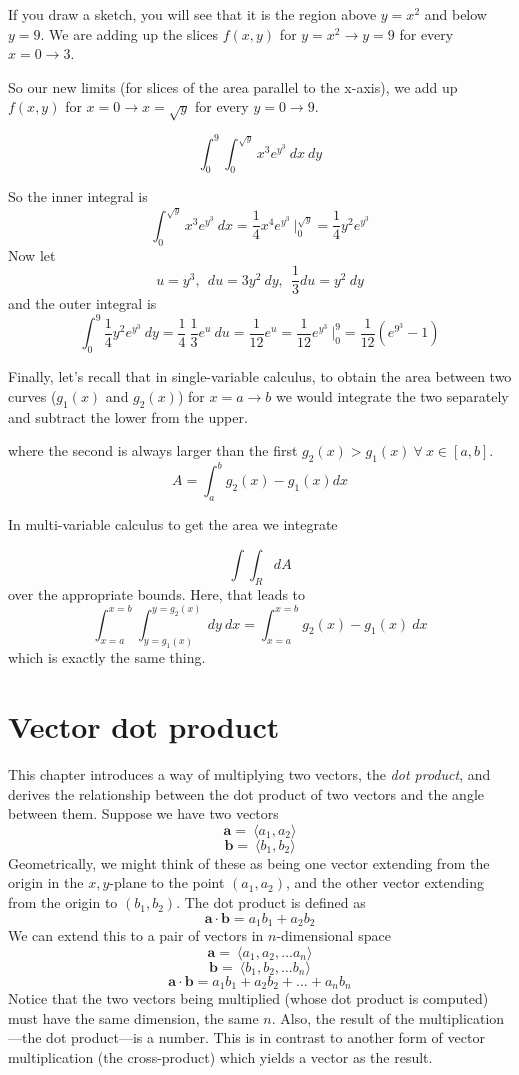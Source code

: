 \documentclass[11pt, oneside]{report}   	%
\begin{document}
If you draw a sketch, you will see that it is the region above $y=x^2$ and below $y=9$.  We are adding up the slices $f(x,y)$ for $y=x^2 \to y=9$ for every $x = 0 \to 3$.

So our new limits (for slices of the area parallel to the x-axis), we add up $f(x,y)$ for $x=0 \to x=\sqrt{y}$ for every $y = 0 \to 9$.

\[ \int_{0}^9 \int_0^{\sqrt{y}} x^3 e^{y^3} \ dx \ dy \]

So the inner integral is
\[ \int_0^{\sqrt{y}} x^3 e^{y^3} \ dx = \frac{1}{4}x^4 e^{y^3} \ \bigg |_{0}^{\sqrt{y}} = \frac{1}{4}y^2 e^{y^3} \]
Now let 
\[ u = y^3, \ \ du = 3y^2 \ dy, \ \ \frac{1}{3} du = y^2 \ dy \]
and the outer integral is
\[ \int_{0}^9 \frac{1}{4}y^2 e^{y^3} \ dy = \frac{1}{4} \ \frac{1}{3} e^u \ du = \frac{1}{12} e^u = \frac{1}{12} e^{y^3}   \ \bigg |_{0}^9 = \frac{1}{12} (e^{9^3} - 1)\]

Finally, let's recall that in single-variable calculus, to obtain the area between two curves ($g_1(x)$ and $g_2(x)$) for $x = a \to b$ we would integrate the two separately and subtract the lower from the upper.

where the second is always larger than the first $g_2(x) > g_1(x) \ \forall \ x \in [a,b] $.
\[ A = \int_a^b g_2(x) - g_1(x) dx \]

In multi-variable calculus to get the area we integrate

\[ \int \int_R dA \]
over the appropriate bounds.  Here, that leads to
\Large
\[ \int_{x=a}^{x=b} \int_{y=g_1(x)}^{y=g_2(x)} \ dy \ dx = \int_{x=a}^{x=b} g_2(x) - g_1(x) \ dx \]
which is exactly the same thing.

\chapter{Vector dot product}

This chapter introduces a way of multiplying two vectors, the \emph{dot product}, and derives the relationship between the dot product of two vectors and the angle between them.  Suppose we have two vectors
\[ \mathbf{a} = \ \langle a_1,a_2 \rangle \]
\[ \mathbf{b} = \ \langle b_1,b_2 \rangle \]
Geometrically, we might think of these as being one vector extending from the origin in the $x,y$-plane to the point $(a_1,a_2)$, and the other vector extending from the origin to $(b_1,b_2)$.  The dot product is defined as 
\[ \mathbf{a} \cdot \mathbf{b} = a_1 b_1 + a_2 b_2 \]
We can extend this to a pair of vectors in $n$-dimensional space
\[ \mathbf{a} = \ \langle a_1,a_2, \dots a_n \rangle \]
\[ \mathbf{b} = \ \langle b_1,b_2, \dots b_n \rangle \]
\[ \mathbf{a} \cdot \mathbf{b} = a_1 b_1 + a_2 b_2 + \dots + a_n b_n \]
Notice that the two vectors being multiplied (whose dot product is computed) must have the same dimension, the same $n$.  Also, the result of the multiplication---the dot product---is a number.  This is in contrast to another form of vector multiplication (the cross-product) which yields a vector as the result.
\end{document}
